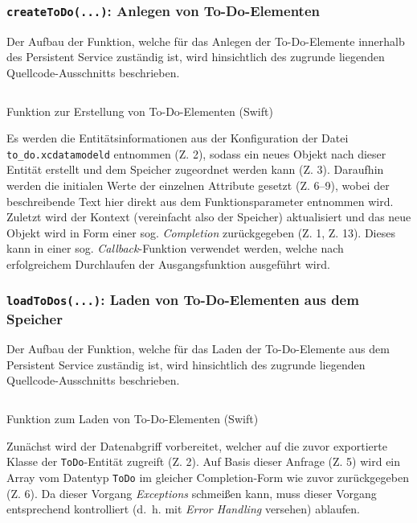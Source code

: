 \subsubsection{\texttt{createToDo(...)}: Anlegen von To-Do-Elementen}
Der Aufbau der Funktion, welche für das Anlegen der To-Do-Elemente innerhalb des Persistent Service zuständig ist, wird hinsichtlich des zugrunde liegenden Quellcode-Ausschnitts beschrieben.


\begin{listing}[H]
	\inputminted{Swift}{sourcecode/ios_createToDo.swift}	
	\caption{Funktion zur Erstellung von To-Do-Elementen (Swift)}
\end{listing}

Es werden die Entitätsinformationen aus der Konfiguration der Datei \texttt{to\_do.xcdatamodeld} entnommen (Z. 2), sodass ein neues Objekt nach dieser Entität erstellt und dem Speicher zugeordnet werden kann (Z. 3). Daraufhin werden die initialen Werte der einzelnen Attribute gesetzt (Z. 6--9), wobei der beschreibende Text hier direkt aus dem Funktionsparameter entnommen wird. Zuletzt wird der Kontext (vereinfacht also der Speicher) aktualisiert und das neue Objekt wird in Form einer sog. \textit{Completion} zurückgegeben (Z. 1, Z. 13). Dieses kann in einer sog. \textit{Callback}-Funktion verwendet werden, welche nach erfolgreichem Durchlaufen der Ausgangsfunktion ausgeführt wird.

\subsubsection{\texttt{loadToDos(...)}: Laden von To-Do-Elementen aus dem Speicher}
Der Aufbau der Funktion, welche für das Laden der To-Do-Elemente aus dem Persistent Service zuständig ist, wird hinsichtlich des zugrunde liegenden Quellcode-Ausschnitts beschrieben.

\begin{listing}[H]
	\inputminted{Swift}{sourcecode/ios_loadToDos.swift}	
	\caption{Funktion zum Laden von To-Do-Elementen (Swift)}
\end{listing}

Zunächst wird der Datenabgriff vorbereitet, welcher auf die zuvor exportierte Klasse der \texttt{ToDo}-Entität zugreift (Z. 2). Auf Basis dieser Anfrage (Z. 5) wird ein Array vom Datentyp \texttt{ToDo} im gleicher Completion-Form wie zuvor zurückgegeben (Z. 6). Da dieser Vorgang \textit{Exceptions} schmeißen kann, muss dieser Vorgang entsprechend kontrolliert (d.\ h. mit \textit{Error Handling} versehen) ablaufen.

